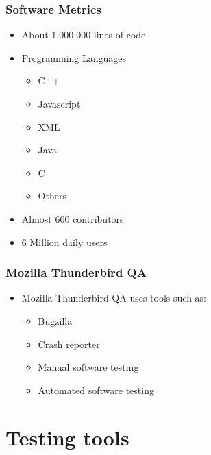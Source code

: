 \documentclass{beamer}
\begin{document}

\begin{frame}
\frametitle{Software Metrics}
 \begin{itemize}
 \item About 1.000.000 lines of code
 \item Programming Languages
    \begin{itemize}
     \item C++
     \item Javascript
     \item XML
     \item Java
     \item C
     \item Others
    \end{itemize}
 \item Almost 600 contributors
 \item 6 Million daily users
 \end{itemize}
\end{frame}


\begin{frame}
 \frametitle{Mozilla Thunderbird QA}
 \begin{itemize}
 \item Mozilla Thunderbird QA uses tools such as:
     \begin{itemize}
     \item Bugzilla
     \item Crash reporter
     \item Manual software testing
     \item Automated software testing 
     \end{itemize}
 \end{itemize}
\end{frame}


\section{Testing tools}

\end{document}
